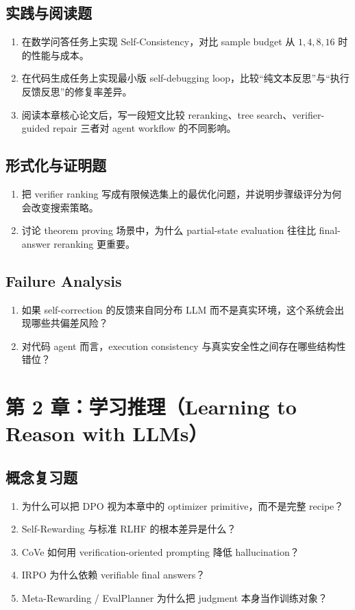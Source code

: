 \subsection*{实践与阅读题}
\begin{enumerate}
\item 在数学问答任务上实现 Self-Consistency，对比 sample budget 从 $1, 4, 8, 16$ 时的性能与成本。
\item 在代码生成任务上实现最小版 self-debugging loop，比较“纯文本反思”与“执行反馈反思”的修复率差异。
\item 阅读本章核心论文后，写一段短文比较 reranking、tree search、verifier-guided repair 三者对 agent workflow 的不同影响。
\end{enumerate}

\subsection*{形式化与证明题}
\begin{enumerate}
\item 把 verifier ranking 写成有限候选集上的最优化问题，并说明步骤级评分为何会改变搜索策略。
\item 讨论 theorem proving 场景中，为什么 partial-state evaluation 往往比 final-answer reranking 更重要。
\end{enumerate}

\subsection*{Failure Analysis}
\begin{enumerate}
\item 如果 self-correction 的反馈来自同分布 LLM 而不是真实环境，这个系统会出现哪些共偏差风险？
\item 对代码 agent 而言，execution consistency 与真实安全性之间存在哪些结构性错位？
\end{enumerate}

\section{第 2 章：学习推理（Learning to Reason with LLMs）}

\subsection*{概念复习题}
\begin{enumerate}
\item 为什么可以把 DPO 视为本章中的 optimizer primitive，而不是完整 recipe？
\item Self-Rewarding 与标准 RLHF 的根本差异是什么？
\item CoVe 如何用 verification-oriented prompting 降低 hallucination？
\item IRPO 为什么依赖 verifiable final answers？
\item Meta-Rewarding / EvalPlanner 为什么把 judgment 本身当作训练对象？
\end{enumerate}

